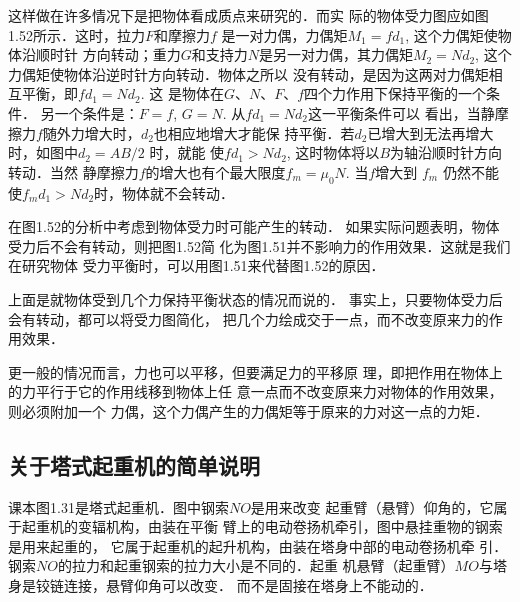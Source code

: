 这样做在许多情况下是把物体看成质点来研究的．而实
际的物体受力图应如图1.52所示．这时，拉力$F$和摩擦力$f$
是一对力偶，力偶矩$M_1=fd_1$, 这个力偶矩使物体沿顺时针
方向转动；重力$G$和支持力$N$是另一对力偶，其力偶矩$M_2
=Nd_2$, 这个力偶矩使物体沿逆时针方向转动．物体之所以
没有转动，是因为这两对力偶矩相互平衡，即$fd_1=Nd_2$. 这
是物体在$G$、$N$、$F$、$f$四个力作用下保持平衡的一个条件．
另一个条件是：$F=f$, $G=N$. 从$fd_1=Nd_2$这一平衡条件可以
看出，当静摩擦力$f$随外力增大时，$d_2$也相应地增大才能保
持平衡．若$d_2$已增大到无法再增大时，如图中$d_2=AB/2$
时，就能
使$fd_1>Nd_2$, 这时物体将以$B$为轴沿顺时针方向转动．当然
静摩擦力$f$的增大也有个最大限度$f_m=\mu_0 N$. 当$f$增大到
$f_m$ 仍然不能使$f_md_1>Nd_2$时，物体就不会转动．

在图1.52的分析中考虑到物体受力时可能产生的转动．
如果实际问题表明，物体受力后不会有转动，则把图1.52简
化为图1.51并不影响力的作用效果．这就是我们在研究物体
受力平衡时，可以用图1.51来代替图1.52的原因．

上面是就物体受到几个力保持平衡状态的情况而说的．
事实上，只要物体受力后会有转动，都可以将受力图简化，
把几个力绘成交于一点，而不改变原来力的作用效果．

更一般的情况而言，力也可以平移，但要满足力的平移原
理，即把作用在物体上的力平行于它的作用线移到物体上任
意一点而不改变原来力对物体的作用效果，则必须附加一个
力偶，这个力偶产生的力偶矩等于原来的力对这一点的力矩．

\subsection{关于塔式起重机的简单说明}

课本图1.31是塔式起重机．图中钢索$NO$是用来改变
起重臂（悬臂）仰角的，它属于起重机的变辐机构，由装在平衡
臂上的电动卷扬机牵引，图中悬挂重物的钢索是用来起重的，
它属于起重机的起升机构，由装在塔身中部的电动卷扬机牵
引．钢索$NO$的拉力和起重钢索的拉力大小是不同的．起重
机悬臂（起重臂）$MO$与塔身是铰链连接，悬臂仰角可以改变．
而不是固接在塔身上不能动的．


